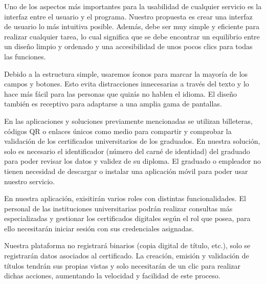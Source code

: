 Uno de los aspectos más importantes para la usabilidad de cualquier servicio es la interfaz entre el usuario y el programa. Nuestro propuesta es crear una interfaz de usuario lo más intuitiva posible. Además, debe ser muy simple y eficiente para realizar cualquier tarea, lo cual significa que se debe encontrar un equilibrio entre un diseño limpio y ordenado y una accesibilidad de unos pocos clics para todas las funciones.

Debido a la estructura simple, usaremos íconos para marcar la mayoría de los campos y botones. Esto evita distracciones innecesarias a través del texto y lo hace más fácil para las personas que quizás no hablen el idioma. El diseño también es receptivo para adaptarse a una amplia gama de pantallas.

En las aplicaciones y soluciones previamente mencionadas se utilizan billeteras, códigos QR o enlaces únicos como medio para compartir y comprobar la validación de los certificados universitarios de los graduados. En nuestra solución, solo es necesario el identificador (número del carné de identidad) del graduado para poder revisar los datos y validez de su diploma. El graduado o empleador no tienen necesidad de descargar o instalar una aplicación móvil para poder usar nuestro servicio.

En nuestra aplicación, exisitirán varios roles con distintas funcionalidades. El personal de las instituciones universitarias podrán realizar consultas más especializadas y gestionar los certificados digitales según el rol que posea, para ello necesitarán iniciar sesión con sus credenciales asignadas. 

Nuestra plataforma no registrará binarios (copia digital de título, etc.), solo se registrarán datos asociados al certificado. La creación, emisión y validación de títulos tendrán sus propias vistas y solo necesitarán de un clic para realizar dichas acciones, aumentando la velocidad y facilidad de este proceso.




